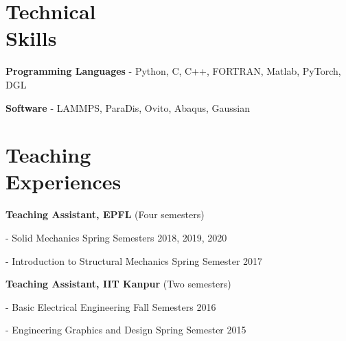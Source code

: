 \documentclass[margin,line]{resume}
\begin{document}
\begin{resume}
    \section{\mysidestyle Technical \\Skills}
    \textbf{\textsf{Programming Languages}} - Python, C, C++,  FORTRAN, Matlab, PyTorch, DGL

    \textbf{\textsf{Software}} -  LAMMPS, ParaDis, Ovito, Abaqus, Gaussian

    \section{\mysidestyle Teaching \\Experiences}

    \textbf{\textsf{Teaching Assistant, EPFL}} \textsf{(Four semesters)}
    \vspace{-0.3cm}\begin{compactitem}
        \item[-] Solid Mechanics \hfill \small{Spring  Semesters 2018, 2019, 2020}
        \item[-] Introduction to Structural Mechanics  \hfill \small{Spring  Semester 2017}
    \end{compactitem}

    \textbf{\textsf{Teaching Assistant, IIT Kanpur}} \textsf{(Two semesters)}
    \vspace{-0.3cm}\begin{compactitem}
        \item[-] Basic Electrical Engineering \hfill \small{Fall  Semesters 2016}
        \item[-] Engineering Graphics and Design  \hfill \small{Spring  Semester 2015}
    \end{compactitem}






\end{resume}
\end{document}

